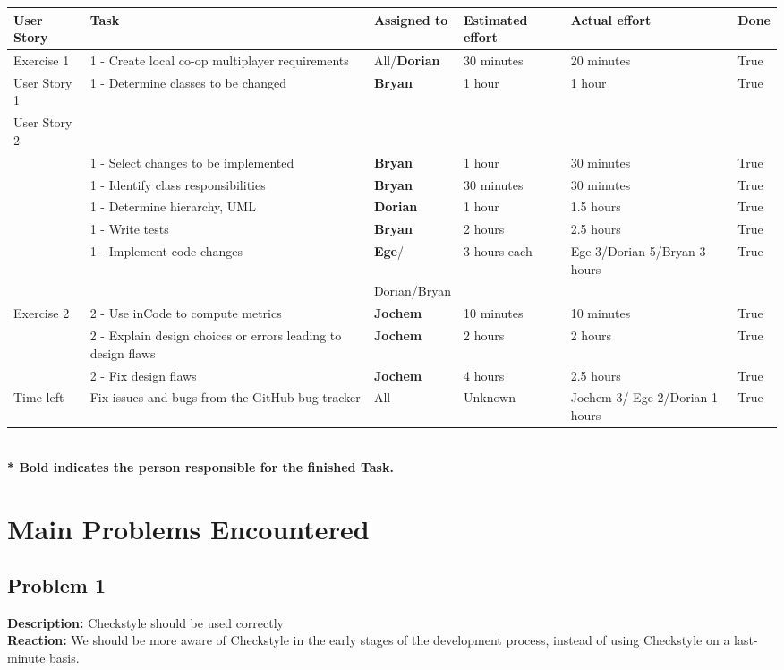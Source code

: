 \documentclass[10pt]{article}
\begin{document}
\begin{center}

    \hspace*{-3cm}\begin{tabular}{ | p{2cm} | p{9cm} | p{2cm} | p{1.8cm} | p{1.8cm} | p{1cm} |}
    \hline
    User Story & Task & Assigned to & Estimated effort & Actual effort & Done \\ \hline
    Exercise 1 & 1 - Create local co-op multiplayer requirements & All/\textbf{Dorian} & 30 minutes & 20 minutes & True\\ 
    User Story 1 & 1 - Determine classes to be changed & \textbf{Bryan} & 1 hour & 1 hour & True\\ 
    User Story 2 & & & & &\\ 
    & 1 - Select changes to be implemented & \textbf{Bryan} & 1 hour & 30 minutes & True\\ 
    & 1 - Identify class responsibilities & \textbf{Bryan} & 30 minutes & 30 minutes & True\\ 
    & 1 - Determine hierarchy, UML & \textbf{Dorian} & 1 hour & 1.5 hours & True\\ 
    & 1 - Write tests & \textbf{Bryan}  & 2 hours & 2.5 hours & True\\
    & 1 - Implement code changes & \textbf{Ege}/ & 3 hours each & Ege 3/Dorian 5/Bryan 3 hours & True\\ 
     & & Dorian/Bryan &  & & \\ \hline
    Exercise 2  & 2 - Use inCode to compute metrics & \textbf{Jochem} & 10 minutes & 10 minutes & True\\ 
    & 2 - Explain design choices or errors leading to design flaws & \textbf{Jochem} & 2 hours & 2 hours & True\\  
    & 2 - Fix design flaws & \textbf{Jochem} & 4 hours & 2.5 hours & True\\ \hline           
    Time left & Fix issues and bugs from the GitHub bug tracker & All & Unknown & Jochem 3/ Ege 2/Dorian 1 hours & True\\ \hline     
    \end{tabular}
    \\ 
    \textbf{* Bold indicates the person responsible for the finished Task. } 
\end{center}

\section*{Main Problems Encountered}
\subsection*{Problem 1}
\textbf{Description:}
Checkstyle should be used correctly\\
\textbf{Reaction:} 
We should be more aware of Checkstyle in the early stages of the development process, instead of using Checkstyle on a last-minute basis.
\end{document}
